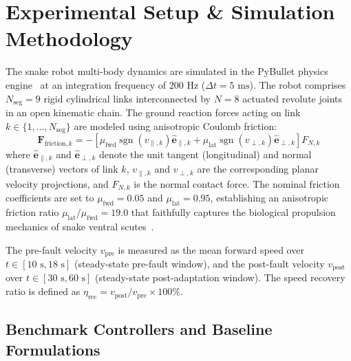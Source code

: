 \documentclass{iopjournal}
\begin{document}
\section{Experimental Setup \& Simulation Methodology}
\label{sec:setup}

The snake robot multi-body dynamics are simulated in the PyBullet physics engine~\cite{coumans2023} at an integration frequency of $200\text{ Hz}$ ($\Delta t = 5\text{ ms}$). The robot comprises $N_{\text{seg}} = 9$ rigid cylindrical links interconnected by $N = 8$ actuated revolute joints in an open kinematic chain. The ground reaction forces acting on link $k \in \{1, \dots, N_{\text{seg}}\}$ are modeled using anisotropic Coulomb friction:
\begin{equation}
\mathbf{F}_{\text{friction}, k} = -\left[\mu_{\text{fwd}} \operatorname{sgn}(v_{\parallel, k}) \hat{\mathbf{e}}_{\parallel, k} + \mu_{\text{lat}} \operatorname{sgn}(v_{\perp, k}) \hat{\mathbf{e}}_{\perp, k}\right] F_{N, k}
\label{eq:friction_model}
\end{equation}
where $\hat{\mathbf{e}}_{\parallel, k}$ and $\hat{\mathbf{e}}_{\perp, k}$ denote the unit tangent (longitudinal) and normal (transverse) vectors of link $k$, $v_{\parallel, k}$ and $v_{\perp, k}$ are the corresponding planar velocity projections, and $F_{N, k}$ is the normal contact force. The nominal friction coefficients are set to $\mu_{\text{fwd}} = 0.05$ and $\mu_{\text{lat}} = 0.95$, establishing an anisotropic friction ratio $\mu_{\text{lat}} / \mu_{\text{fwd}} = 19.0$ that faithfully captures the biological propulsion mechanics of snake ventral scutes~\cite{hirose1993,transeth2009}.

The pre-fault velocity $v_{\text{pre}}$ is measured as the mean forward speed over $t \in [10\text{ s}, 18\text{ s}]$ (steady-state pre-fault window), and the post-fault velocity $v_{\text{post}}$ over $t \in [30\text{ s}, 60\text{ s}]$ (steady-state post-adaptation window). The speed recovery ratio is defined as $\eta_{\text{rec}} = v_{\text{post}} / v_{\text{pre}} \times 100\%$.

\subsection{Benchmark Controllers and Baseline Formulations}
\end{document}
